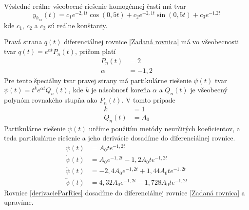\documentclass[a4paper, 10pt, ]{article}
\begin{document}
%




Výsledné reálne všeobecné riešenie homogénnej časti má tvar
\begin{equation} \label{Výsledné reálne všeobecné riešenie homogénnej}
	y_{h_{vs}}(t) = c_1 e^{-2,1t} \cos(0,5t) + c_2 e^{-2,1t} \sin(0,5t) + c_3 e^{-1.2t}
\end{equation}
kde $c_1$, $c_2$ a $c_3$ sú reálne konštanty.




Pravá strana $q(t)$ diferenciálnej rovnice \eqref{Zadaná rovnica} má vo všeobecnosti tvar $q(t) = e^{\alpha t} P_n(t)$, pričom platí
\begin{subequations}
	\begin{align}
		P_n(t) &= 2 \\
		\alpha &= -1,2
	\end{align}
\end{subequations}
Pre tento špeciálny tvar pravej strany má partikulárne riešenie $\psi(t)$ tvar $\psi(t) = t^k e^{\alpha t} Q_n(t)$, kde $k$ je násobnosť koreňa $\alpha$ a $Q_n(t)$ je všeobecný polynóm rovnakého stupňa ako $P_n(t)$. V tomto prípade
\begin{subequations}
	\begin{align}
		k &= 1 \\
		Q_n(t) &= A_0
	\end{align}
\end{subequations}
Partikulárne riešenie $\psi(t)$ určíme použitím metódy neurčitých koeficientov, a teda partikulárne riešenie a jeho derivácie dosadíme do diferenciálnej rovnice.
\begin{subequations} \label{derivacieParRies}
	\begin{align}
		\psi(t) &= A_0 t e^{-1,2 t} \\
		\dot{\psi}(t) &=  A_0 e^{-1,2t} - 1,2 A_0 t e^{-1,2t}\\
		\ddot{\psi}(t) &= -2,4 A_0 e^{-1,2t} + 1,44 A_0 t e^{-1,2t} \\
		\dddot{\psi}(t) &= 4,32 A_0 e^{-1,2t} - 1,728 A_0 t e^{-1,2t}
	\end{align}
\end{subequations}
Rovnice \eqref{derivacieParRies} dosadíme do diferenciálnej rovnice \eqref{Zadaná rovnica} a upravíme.
\end{document}
